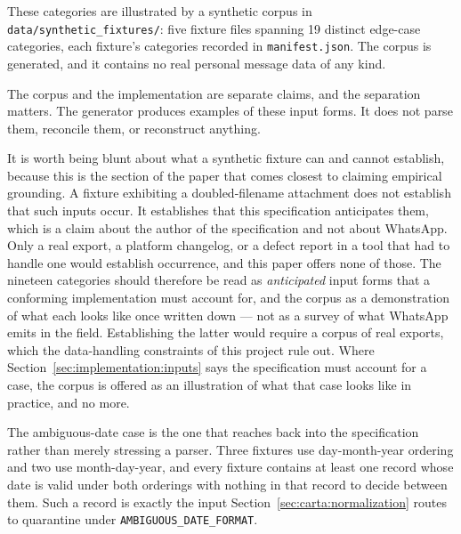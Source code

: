 These categories are illustrated by a synthetic corpus in
\texttt{data/synthetic\_fixtures/}: five fixture files spanning 19 distinct
edge-case categories, each fixture's categories recorded in
\texttt{manifest.json}. The corpus is generated, and it contains no real personal
message data of any kind.

The corpus and the implementation are separate claims, and the separation matters.
The generator produces examples of these input forms. It does not parse them,
reconcile them, or reconstruct anything.

It is worth being blunt about what a synthetic fixture can and cannot establish,
because this is the section of the paper that comes closest to claiming empirical
grounding. A fixture exhibiting a doubled-filename attachment does not establish
that such inputs occur. It establishes that this specification anticipates them,
which is a claim about the author of the specification and not about WhatsApp.
Only a real export, a platform changelog, or a defect report in a tool that had to
handle one would establish occurrence, and this paper offers none of those. The
nineteen categories should therefore be read as \emph{anticipated} input forms
that a conforming implementation must account for, and the corpus as a
demonstration of what each looks like once written down --- not as a survey of what
WhatsApp emits in the field. Establishing the latter would require a corpus of
real exports, which the data-handling constraints of this project rule out.
Where Section~\ref{sec:implementation:inputs} says the specification must account
for a case, the corpus is offered as an illustration of what that case looks like
in practice, and no more.

The ambiguous-date case is the one that reaches back into the specification rather
than merely stressing a parser. Three fixtures use day-month-year ordering and two
use month-day-year, and every fixture contains at least one record whose date is
valid under both orderings with nothing in that record to decide between them.
Such a record is exactly the input Section~\ref{sec:carta:normalization} routes to
quarantine under \texttt{AMBIGUOUS\_DATE\_FORMAT}.

